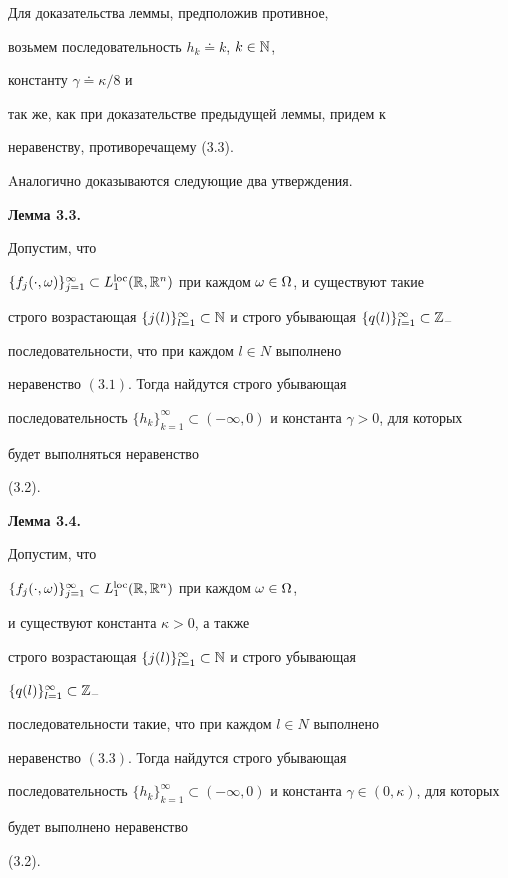 \medskip





Для доказательства леммы, предположив противное,


возьмем последовательность $h_k\doteq k$, $k\in\Bbb N$,


константу $\gamma\doteq \kappa/8$ и


так же, как при доказательстве предыдущей леммы, придем к


неравенству, противоречащему (3.3).





Aналогично доказываются следующие два утверждения.


\medskip





{\bf Лемма 3.3.} {\it


Допустим, что 


$\{f_j(\cdot,\omega)\}_{j=1}^{\infty}\subset


L_1^{\loc}(\Bbb R,\Bbb R^n)$ при каждом $\mm$, и существуют такие


строго возрастающая $\{j(l)\}_{l=1}^{\infty}\subset


\Bbb N$ и строго убывающая $\{q(l)\}_{l=1}^{\infty}\subset\Bbb Z_-$


последовательности, что при каждом $l\in N$ выполнено


неравенство $(3.1)$. Тогда найдутся строго убывающая


последовательность $\{h_k\}_{k=1}^{\infty}\subset


(-\infty,0)$ и константа $\gamma>0$, для которых


будет выполняться неравенство} (3.2).


\medskip





{\bf Лемма 3.4.} {\it


Допустим, что 


$\{f_j(\cdot,\omega)\}_{j=1}^{\infty}\subset


L_1^{\loc}(\Bbb R,\Bbb R^n)$ при каждом $\mm$,


и существуют константа $\kappa>0$, а также


строго возрастающая $\{j(l)\}_{l=1}^{\infty}\subset


\Bbb N$ и строго убывающая


$\{q(l)\}_{l=1}^{\infty}\subset\Bbb Z_-$


последовательности такие, что при каждом $l\in N$ выполнено


неравенство $(3.3)$. Тогда найдутся строго убывающая


последовательность $\{h_k\}_{k=1}^{\infty}\subset


(-\infty,0)$ и константа $\gamma\in (0,\kappa)$, для которых


будет выполнено неравенство} (3.2).



